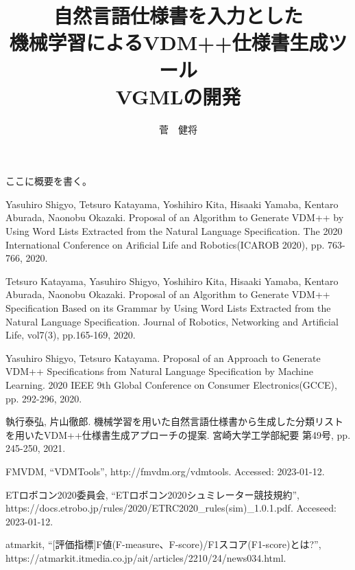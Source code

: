 \documentclass[uplatex, report, a4j, 10pt]{jsbook}
\title{自然言語仕様書を入力とした\\機械学習によるVDM++仕様書生成ツール\\VGMLの開発}
\author{菅　健将}
\begin{document}
\maketitle

%
% 
ここに概要を書く。


%
% 








%


%
\begin{thebibliography}{10}
	    
    Yasuhiro Shigyo, Tetsuro Katayama, Yoshihiro Kita, Hisaaki Yamaba, Kentaro Aburada, Naonobu Okazaki. 
    Proposal of an Algorithm to Generate VDM++ by Using Word Lists Extracted from the Natural Language Specification. 
    The 2020 International Conference on Arificial Life and Robotics(ICAROB 2020), 
    pp. 763-766, 2020.
    
    Tetsuro Katayama, Yasuhiro Shigyo, Yoshihiro Kita, Hisaaki Yamaba, Kentaro Aburada, Naonobu Okazaki. 
    Proposal of an Algorithm to Generate VDM++ Specification Based on its Grammar by Using Word Lists Extracted from the Natural Language Specification. 
    Journal of Robotics, Networking and Artiﬁcial Life, vol7(3), pp.165-169, 2020.

     Yasuhiro Shigyo, Tetsuro Katayama. 
    Proposal of an Approach to Generate VDM++ Specifications from Natural Language Specification by Machine Learning. 
    2020 IEEE 9th Global Conference on Consumer Electronics(GCCE), 
    pp. 292-296, 2020.

    執行泰弘, 片山徹郎. 
    機械学習を用いた自然言語仕様書から生成した分類リストを用いたVDM++仕様書生成アプローチの提案. 
    宮崎大学工学部紀要 第49号, 
    pp. 245-250, 2021.

    FMVDM, “VDMTools”, http:\slash \slash fmvdm.org\slash vdmtools. Accessed: 2023-01-12.

    ETロボコン2020委員会,  “ETロボコン2020シュミレーター競技規約”, https:\slash \slash docs.etrobo.jp\slash rules\slash 2020\slash ETRC2020\_rules(sim)\_1.0.1.pdf. Acceseed: 2023-01-12.

    atmarkit, ``[評価指標]F値(F-measure、F-score)\slash F1スコア(F1-score)とは?'', https:\slash \slash atmarkit.itmedia.co.jp\slash ait\slash articles\slash 2210\slash 24\slash news034.html.


\end{thebibliography}
\end{document}
